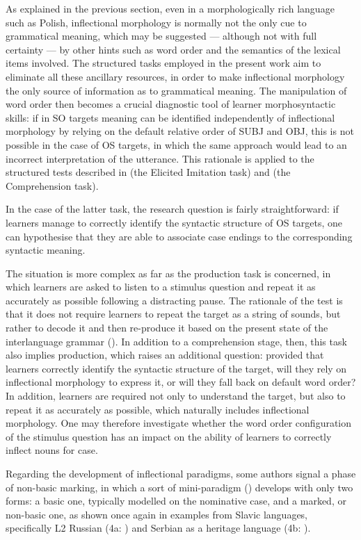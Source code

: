 As explained in the previous section, even in a morphologically rich language such as Polish, inflectional morphology is normally not the only cue to grammatical meaning, which may be suggested — although not with full certainty — by other hints such as word order and the semantics of the lexical items involved. The structured tasks employed in the present work aim to eliminate all these ancillary resources, in order to make inflectional morphology the only source of information as to grammatical meaning. The manipulation of word order then becomes a crucial diagnostic tool of learner morphosyntactic skills: if in SO targets meaning can be identified independently of inflectional morphology by relying on the default relative order of SUBJ and OBJ, this is not possible in the case of OS targets, in which the same approach would lead to an incorrect interpretation of the utterance. This rationale is applied to the structured tests described in  (the Elicited Imitation task) and  (the Comprehension task).

In the case of the latter task, the research question is fairly straightforward: if learners manage to correctly identify the syntactic structure of OS targets, one can hypothesise that they are able to associate case endings to the corresponding syntactic meaning.

The situation is more complex as far as the production task is concerned, in which learners are asked to listen to a stimulus question and repeat it as accurately as possible following a distracting pause. The rationale of the test is that it does not require learners to repeat the target as a string of sounds, but rather to decode it and then re-produce it based on the present state of the interlanguage grammar (). In addition to a comprehension stage, then, this task also implies production, which raises an additional question: provided that learners correctly identify the syntactic structure of the target, will they rely on inflectional morphology to express it, or will they fall back on default word order? In addition, learners are required not only to understand the target, but also to repeat it as accurately as possible, which naturally includes inflectional morphology. One may therefore investigate whether the word order configuration of the stimulus question has an impact on the ability of learners to correctly inflect nouns for case.

Regarding the development of inflectional paradigms, some authors signal a phase of non-basic marking, in which a sort of mini-paradigm (\citealt{BittnerEtAl2000}) develops with only two forms: a basic one, typically modelled on the nominative case, and a marked, or non-basic one, as shown once again in examples from Slavic languages, specifically L2 Russian (4a: \citealt[188]{ArtoniMagnani2015}) and Serbian as a heritage language (4b: \citealt[209]{Di-BiaseBettoni2015}). 

